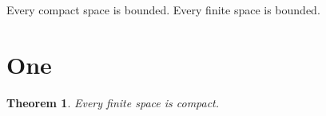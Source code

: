 \documentclass{article}
\newtheorem{theorem}{Theorem}[section]
\newenvironment{customthm}[1]
  {\renewcommand\theinnercustomthm{#1}\innercustomthm}
  {\endinnercustomthm}
\begin{document}
\begin{customthm}{A} Every compact space is bounded. \end{customthm}
\begin{customthm}{B} Every finite space is bounded. \end{customthm}
\section{One}
\begin{theorem} Every finite space is compact. \end{theorem}
\end{document}
